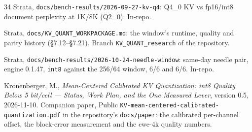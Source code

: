 \documentclass[10pt,twocolumn]{article}
\begin{document}
\begin{thebibliography}{34}
Strata, \texttt{docs/bench-results/2026-09-27-kv-q4}: Q4\_0 KV vs fp16/int8 document perplexity at 1K/8K (Q2\_0). In-repo.

Strata, \texttt{docs/KV\_QUANT\_WORKPACKAGE.md}: the window's runtime, quality and parity history (\S7.12--\S7.21). Branch \texttt{KV\_QUANT\_research} of the repository.

Strata, \texttt{docs/bench-results/2026-10-24-needle-window}: same-day needle pair, engine 0.1.47, \texttt{int8} against the 256/64 window, 6/6 and 6/6. In-repo.

Kronenberger, M., \emph{Mean-Centered Calibrated KV Quantization: int8 Quality Below 5 bit/cell --- Status, Work Plan, and the One Measured Lever}, version 0.5, 2026-11-10. Companion paper, Public \texttt{KV-mean-centered-calibrated-quantization.pdf} in the repository's \texttt{docs/paper}: the calibrated per-channel offset, the block-error measurement and the cwe-4k quality numbers.

\end{thebibliography}
\end{document}
